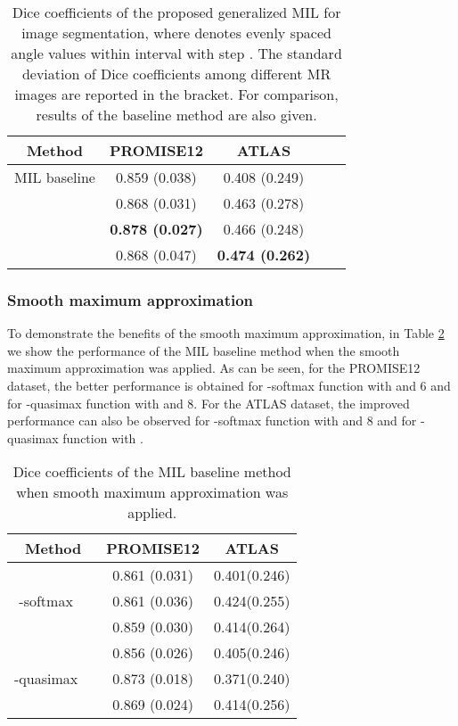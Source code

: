 \documentclass[runningheads]{llncs}
\begin{document}
\renewcommand\arraystretch{1.3}
\begin{table}
\caption{Dice coefficients of the proposed generalized MIL for image segmentation, where  denotes evenly spaced angle values within interval  with step . The standard deviation of Dice coefficients among different MR images are reported in the bracket. For comparison, results of the baseline method are also given.}
\centering
\label{table}
\setlength{\tabcolsep}{5pt}
\begin{tabular}{ccccc}
\hline
\hline
Method & PROMISE12 & ATLAS \\
\hline
MIL baseline & 0.859 (0.038) & 0.408 (0.249) \\
 & 0.868 (0.031) & 0.463 (0.278) \\
 & \textbf{0.878 (0.027)} & 0.466 (0.248) \\
 & 0.868 (0.047) & \textbf{0.474 (0.262)} \\
\hline
\hline
\end{tabular}
\label{table:ablation_mil}
\end{table}

\subsubsection{Smooth maximum approximation}
To demonstrate the benefits of the smooth maximum approximation, in Table \ref{table:ablation_approximation} we show the performance of the MIL baseline method when the smooth maximum approximation was applied. As can be seen, for the PROMISE12 dataset, the better performance is obtained for -softmax function with  and 6 and for -quasimax function with  and 8. For the ATLAS dataset, the improved performance can also be observed for -softmax function with  and 8 and for -quasimax function with .

\renewcommand\arraystretch{1.3}
\begin{table}
\caption{Dice coefficients of the MIL baseline method when smooth maximum approximation was applied. }
\centering
\label{table}
\setlength{\tabcolsep}{5pt}
\begin{tabular}{cccc}
\hline
\hline
\multicolumn{2}{c}{Method} & PROMISE12 & ATLAS \\
\hline
\multirow{3}{*}{-softmax} &  & 0.861 (0.031) & 0.401(0.246) \\
&  & 0.861 (0.036) & 0.424(0.255) \\
&  & 0.859 (0.030) & 0.414(0.264) \\
\hline
\multirow{3}{*}{-quasimax} &  & 0.856 (0.026) & 0.405(0.246) \\
&  & 0.873 (0.018) & 0.371(0.240) \\
&  & 0.869 (0.024) & 0.414(0.256) \\
\hline
\hline
\end{tabular}
\label{table:ablation_approximation}
\end{table}
\end{document}
